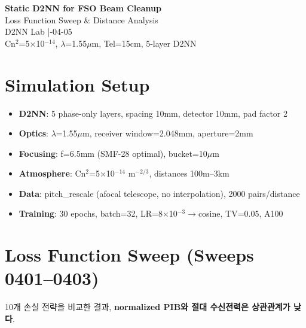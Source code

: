 \documentclass[11pt,a4paper]{article}
\begin{document}
\begin{center}
{\Huge\bfseries\sffamily\textcolor{darkbg}{Static D2NN for FSO Beam Cleanup}}\\[0.5em]
{\LARGE\sffamily\textcolor{accent}{Loss Function Sweep \& Distance Analysis}}\\[1.5em]
{\large\sffamily D2NN Lab \quad|-04-05}\\[0.3em]
{\small\textcolor{muted}{Cn$^2$=5$\times$10$^{-14}$, $\lambda$=1.55$\mu$m, Tel=15cm, 5-layer D2NN}}
\end{center}
\vspace{1em}

\section{Simulation Setup}

\begin{itemize}
\item \textbf{D2NN}: 5 phase-only layers, spacing 10mm, detector 10mm, pad factor 2
\item \textbf{Optics}: $\lambda$=1.55$\mu$m, receiver window=2.048mm, aperture=2mm
\item \textbf{Focusing}: f=6.5mm (SMF-28 optimal), bucket=10$\mu$m
\item \textbf{Atmosphere}: Cn$^2$=5$\times$10$^{-14}$ m$^{-2/3}$, distances 100m--3km
\item \textbf{Data}: pitch\_rescale (afocal telescope, no interpolation), 2000 pairs/distance
\item \textbf{Training}: 30 epochs, batch=32, LR=8$\times$10$^{-3}$$\rightarrow$cosine, TV=0.05, A100
\end{itemize}


\section{Loss Function Sweep (Sweeps 0401--0403)}

10개 손실 전략을 비교한 결과, \textbf{normalized PIB와 절대 수신전력은 상관관계가 낮다}.
\end{document}
